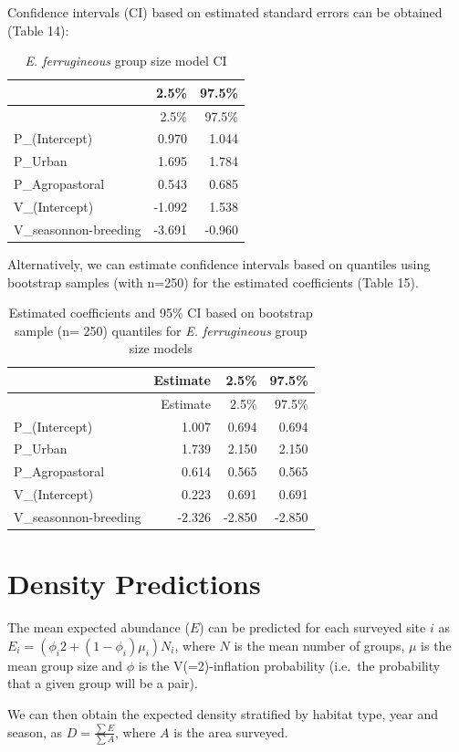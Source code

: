 \documentclass[]{article}
\begin{document}
Confidence intervals (CI) based on estimated standard errors can be
obtained (Table 14):

\begin{longtable}[]{@{}lrr@{}}
\caption{\textit{E. ferrugineous} group size model CI}\tabularnewline
\toprule
& 2.5\% & 97.5\%\tabularnewline
\midrule
\endfirsthead
\toprule
& 2.5\% & 97.5\%\tabularnewline
\midrule
\endhead
P\_(Intercept) & 0.970 & 1.044\tabularnewline
P\_Urban & 1.695 & 1.784\tabularnewline
P\_Agropastoral & 0.543 & 0.685\tabularnewline
V\_(Intercept) & -1.092 & 1.538\tabularnewline
V\_seasonnon-breeding & -3.691 & -0.960\tabularnewline
\bottomrule
\end{longtable}

Alternatively, we can estimate confidence intervals based on quantiles
using bootstrap samples (with n=250) for the estimated coefficients
(Table 15).

\begin{longtable}[]{@{}lrrr@{}}
\caption{Estimated coefficients and 95\% CI based on bootstrap sample
(n= 250) quantiles for \textit{E. ferrugineous} group size
models}\tabularnewline
\toprule
& Estimate & 2.5\% & 97.5\%\tabularnewline
\midrule
\endfirsthead
\toprule
& Estimate & 2.5\% & 97.5\%\tabularnewline
\midrule
\endhead
P\_(Intercept) & 1.007 & 0.694 & 0.694\tabularnewline
P\_Urban & 1.739 & 2.150 & 2.150\tabularnewline
P\_Agropastoral & 0.614 & 0.565 & 0.565\tabularnewline
V\_(Intercept) & 0.223 & 0.691 & 0.691\tabularnewline
V\_seasonnon-breeding & -2.326 & -2.850 & -2.850\tabularnewline
\bottomrule
\end{longtable}

\section{Density Predictions}\label{density-predictions}

The mean expected abundance (\(E\)) can be predicted for each surveyed
site \(i\) as \(E_{i} = (\phi_{i} 2 + (1 - \phi_{i})\mu_{i})N_{i}\),
where \(N\) is the mean number of groups, \(\mu\) is the mean group size
and \(\phi\) is the V(=2)-inflation probability (i.e.~the probability
that a given group will be a pair).

We can then obtain the expected density stratified by habitat type, year
and season, as \(D = \frac{\sum E}{\sum A}\), where \(A\) is the area
surveyed.
\end{document}
